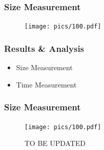 \documentclass[14pt,xcolor=dvipsnames]{beamer}
\begin{document}
\begin{frame}
 \frametitle{Size Measurement}
 \begin{figure}
 \centering
 \texttt{[image: pics/100.pdf]}
 \end{figure}
\end{frame}

\begin{frame}
 \frametitle{Results \& Analysis}
 \begin{itemize}
  \item Size Measurement
  \item Time Measurement
 \end{itemize}
\end{frame}

\begin{frame}
 \frametitle{Size Measurement}
 \begin{figure}
 \centering
 \texttt{[image: pics/100.pdf]}
 \caption{TO BE UPDATED}
 \end{figure}
\end{frame}
\end{document}
